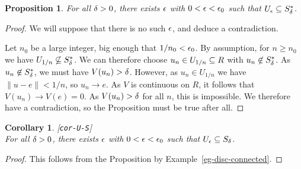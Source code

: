 \documentclass[reqno]{amsart}
\newcommand{\lbl}[1]{\label{#1}\textup{[\texttt{#1}]}\ \\}
\newcommand{\lbl}{\label}
\newtheorem{proposition}[theorem]{Proposition}
\newtheorem{corollary}[theorem]{Corollary}
\theoremstyle{definition}
\begin{document}
\begin{proposition}\label{prop-U-S}
 For all $\delta>0$, there exists $\epsilon$ with $0<\epsilon<\epsilon_0$ such that
 $U_\epsilon\subseteq S_\delta^*$.
\end{proposition}
\begin{proof}
 We will suppose that there is no such $\epsilon$, and deduce a
 contradiction. 

 Let $n_0$ be a large integer, big enough that $1/n_0<\epsilon_0$.  By
 assumption, for $n\geq n_0$ we have $U_{1/n}\not\subseteq S_\delta^*$.  We
 can therefore choose $u_n\in U_{1/n}\subseteq R$ with
 $u_n\not\in S_\delta^*$.  As $u_n\not\in S_\delta^*$, we must have
 $V(u_n)>\delta$.  However, as $u_n\in U_{1/n}$ we have $\|u-e\|<1/n$, so
 $u_n\to e$.  As $V$ is continuous on $R$,  it follows that
 $V(u_n)\to V(e)=0$.  As $V(u_n)>\delta$ for all $n$, this is
 impossible.  We therefore have a contradiction, so the Proposition
 must be true after all.
\end{proof}

\begin{corollary}\lbl{cor-U-S}
 For all $\delta>0$, there exists $\epsilon$ with $0<\epsilon<\epsilon_0$ such that
 $U_\epsilon\subseteq S_\delta$. 
\end{corollary}
\begin{proof}
 This follows from the Proposition by
 Example~\ref{eg-disc-connected}. 
\end{proof}
\end{document}
